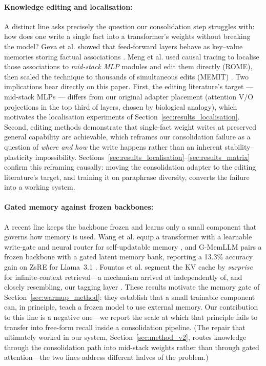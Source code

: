 \paragraph{Knowledge editing and localisation:}
A distinct line asks precisely the question our consolidation step struggles with: how does one write a single fact into a transformer's weights without breaking the model? Geva et al. showed that feed-forward layers behave as key--value memories storing factual associations \citep{geva2021transformer}. Meng et al. used causal tracing to localise those associations to \emph{mid-stack MLP} modules and edit them directly (ROME), then scaled the technique to thousands of simultaneous edits (MEMIT) \citep{meng2022rome,meng2023memit}. Two implications bear directly on this paper. First, the editing literature's target --- mid-stack MLPs --- differs from our original adapter placement (attention V/O projections in the top third of layers, chosen by biological analogy), which motivates the localisation experiments of Section~\ref{sec:results_localisation}. Second, editing methods demonstrate that single-fact weight writes at preserved general capability are achievable, which reframes our consolidation failure as a question of \emph{where and how} the write happens rather than an inherent stability--plasticity impossibility. Sections~\ref{sec:results_localisation}--\ref{sec:results_matrix} confirm this reframing causally: moving the consolidation adapter to the editing literature's target, and training it on paraphrase diversity, converts the failure into a working system.

\paragraph{Gated memory against frozen backbones:}
A recent line keeps the backbone frozen and learns only a small component that governs how memory is used. Wang et al. equip a transformer with a learnable write-gate and neural router for self-updatable memory \citep{wang2024memoryllm}, and G-MemLLM pairs a frozen backbone with a gated latent memory bank, reporting a 13.3\% accuracy gain on ZsRE for Llama~3.1 \citep{gmemllm2026}. Fountas et al. segment the KV cache by \emph{surprise} for infinite-context retrieval---a mechanism arrived at independently of, and closely resembling, our tagging layer \citep{fountas2025emllm}. These results motivate the memory gate of Section~\ref{sec:warmup_method}: they establish that a small trainable component can, in principle, teach a frozen model to use external memory. Our contribution to this line is a negative one---we report the scale at which that principle fails to transfer into free-form recall inside a consolidation pipeline. (The repair that ultimately worked in our system, Section~\ref{sec:method_v2}, routes knowledge through the consolidation path into mid-stack weights rather than through gated attention---the two lines address different halves of the problem.)

